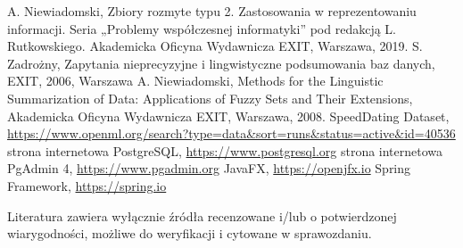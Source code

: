 \documentclass{classrep}
\begin{document}
\begin{thebibliography}{99}
  A. Niewiadomski, Zbiory rozmyte typu 2. Zastosowania w reprezentowaniu informacji.  Seria „Problemy współczesnej informatyki” pod redakcją L. Rutkowskiego. Akademicka Oficyna Wydawnicza EXIT, Warszawa, 2019.
 S. Zadrożny, Zapytania nieprecyzyjne i lingwistyczne podsumowania baz danych, EXIT, 2006, Warszawa
 A. Niewiadomski, Methods for the Linguistic Summarization of Data: Applications of Fuzzy Sets and Their Extensions, Akademicka Oficyna Wydawnicza EXIT, Warszawa, 2008.
 SpeedDating Dataset, \url{https://www.openml.org/search?type=data&sort=runs&status=active&id=40536}
 strona internetowa PostgreSQL, \url{https://www.postgresql.org}
 strona internetowa PgAdmin 4, \url{https://www.pgadmin.org}
 JavaFX, \url{https://openjfx.io}
 Spring Framework, \url{https://spring.io}

\end{thebibliography}

Literatura zawiera wyłącznie źródła recenzowane i/lub o potwierdzonej wiarygodności,
możliwe do weryfikacji i cytowane w sprawozdaniu. 
\end{document}
